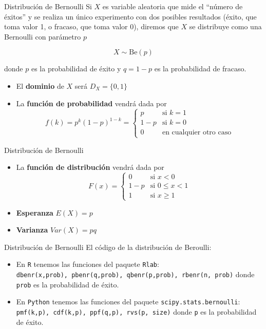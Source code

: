 \documentclass[
  ignorenonframetext,
]{beamer}
\providecommand{\tightlist}{%
  \setlength{\itemsep}{0pt}\setlength{\parskip}{0pt}}
\begin{document}
\begin{frame}{Distribución de Bernoulli}
\protect\hypertarget{distribuciuxf3n-de-bernoulli}{}
Si \(X\) es variable aleatoria que mide el ``número de éxitos'' y se
realiza un único experimento con dos posibles resultados (éxito, que
toma valor 1, o fracaso, que toma valor 0), diremos que \(X\) se
distribuye como una Bernoulli con parámetro \(p\)

\[X\sim \text{Be}(p)\]

donde \(p\) es la probabilidad de éxito y \(q = 1-p\) es la probabilidad
de fracaso.

\begin{itemize}
\tightlist
\item
  El \textbf{dominio} de \(X\) será \(D_X = \{0,1\}\)
\item
  La \textbf{función de probabilidad} vendrá dada por
  \[f(k) = p^k(1-p)^{1-k} =  \left\{
  \begin{array}{rl}
     p & \text{si } k=1 
  \\ 1-p & \text{si } k=0
  \\ 0 & \text{en cualquier otro caso}
  \end{array}
  \right.\]
\end{itemize}
\end{frame}

\begin{frame}{Distribución de Bernoulli}
\protect\hypertarget{distribuciuxf3n-de-bernoulli-1}{}
\begin{itemize}
\tightlist
\item
  La \textbf{función de distribución} vendrá dada por \[F(x) = \left\{
  \begin{array}{rl}
     0 & \text{si } x<0 
  \\ 1-p & \text{si } 0\le x<1
  \\ 1 & \text{si } x\ge 1
  \end{array}
  \right.\]
\item
  \textbf{Esperanza} \(E(X) = p\)
\item
  \textbf{Varianza} \(Var(X) = pq\)
\end{itemize}
\end{frame}

\begin{frame}[fragile]{Distribución de Bernoulli}
\protect\hypertarget{distribuciuxf3n-de-bernoulli-2}{}
El código de la distribución de Beroulli:

\begin{itemize}
\tightlist
\item
  En \texttt{R} tenemos las funciones del paquete \texttt{Rlab}:
  \texttt{dbenr(x,prob),\ pbenr(q,prob),\ qbenr(p,prob),\ rbenr(n,\ prob)}
  donde \texttt{prob} es la probabilidad de éxito.
\item
  En \texttt{Python} tenemos las funciones del paquete
  \texttt{scipy.stats.bernoulli}:
  \texttt{pmf(k,p),\ cdf(k,p),\ ppf(q,p),\ rvs(p,\ size)} donde
  \texttt{p} es la probabilidad de éxito.
\end{itemize}
\end{frame}
\end{document}
